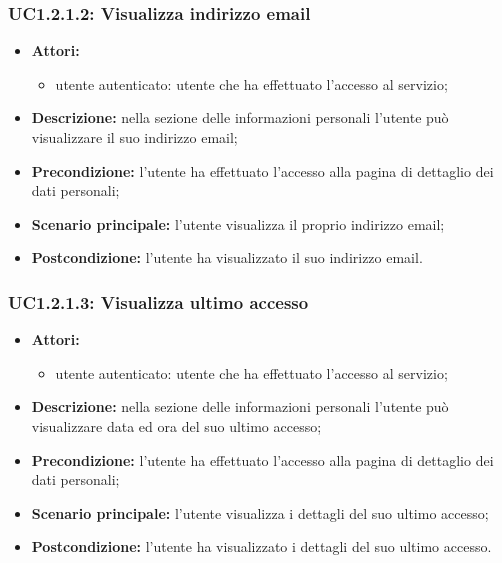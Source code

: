 \subsubsection{UC1.2.1.2: Visualizza indirizzo email}
\begin{itemize}
	\item \textbf{Attori:}
	\begin{itemize}
		\item utente autenticato: utente che ha effettuato l'accesso al servizio;
	\end{itemize}
	\item \textbf{Descrizione:} nella sezione delle informazioni personali l'utente può visualizzare il suo indirizzo email;
	\item \textbf{Precondizione:} l'utente ha effettuato l'accesso alla pagina di dettaglio dei dati personali;
	\item \textbf{Scenario principale:} l'utente visualizza il proprio indirizzo email;
	\item \textbf{Postcondizione:} l'utente ha visualizzato il suo indirizzo email.
\end{itemize}

\subsubsection{UC1.2.1.3: Visualizza ultimo accesso}
\begin{itemize}
	\item \textbf{Attori:}
	\begin{itemize}
		\item utente autenticato: utente che ha effettuato l'accesso al servizio;
	\end{itemize}
	\item \textbf{Descrizione:} nella sezione delle informazioni personali l'utente può visualizzare data ed ora del suo ultimo accesso;
	\item \textbf{Precondizione:} l'utente ha effettuato l'accesso alla pagina di dettaglio dei dati personali;
	\item \textbf{Scenario principale:} l'utente visualizza i dettagli del suo ultimo accesso;
	\item \textbf{Postcondizione:} l'utente ha visualizzato i dettagli del suo ultimo accesso.
\end{itemize}

